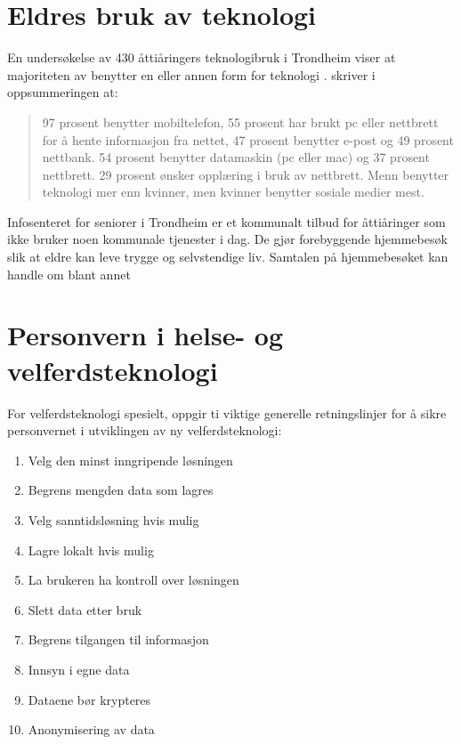 \section{Eldres bruk av teknologi}
\label{sec:eldresbruk}
En undersøkelse av 430 åttiåringers teknologibruk i Trondheim viser at majoriteten av benytter en eller annen
form for teknologi \citep{ergoterapeuten_seniorer}. \citet{ergoterapeuten_seniorer} skriver i oppsummeringen at:
\blockquote{97 prosent benytter mobiltelefon, 55 prosent har brukt pc eller nettbrett
    for å hente informasjon fra nettet, 47 prosent benytter e-post og
    49 prosent nettbank. 54 prosent benytter datamaskin (pc eller mac)
    og 37 prosent nettbrett. 29 prosent ønsker opplæring i bruk av nettbrett.
    Menn benytter teknologi mer enn kvinner, men kvinner benytter
    sosiale medier mest.}
Infosenteret for seniorer i Trondheim er et kommunalt tilbud for åttiåringer som ikke bruker
noen kommunale tjenester i dag. De gjør forebyggende hjemmebesøk slik at eldre kan leve
trygge og selvstendige liv. Samtalen på hjemmebesøket kan handle om blant annet

\section{Personvern i helse- og velferdsteknologi}
For velferdsteknologi spesielt, oppgir \citet{datatilsynet_welfare} ti viktige generelle retningslinjer for å sikre personvernet
i utviklingen av ny velferdsteknologi:

\begin{enumerate}
    \item Velg den minst inngripende løsningen
    \item Begrens mengden data som lagres
    \item Velg sanntidsløsning hvis mulig
    \item Lagre lokalt hvis mulig
    \item La brukeren ha kontroll over løsningen
    \item Slett data etter bruk
    \item Begrens tilgangen til informasjon
    \item Innsyn i egne data
    \item Dataene bør krypteres
    \item Anonymisering av data
\end{enumerate}

